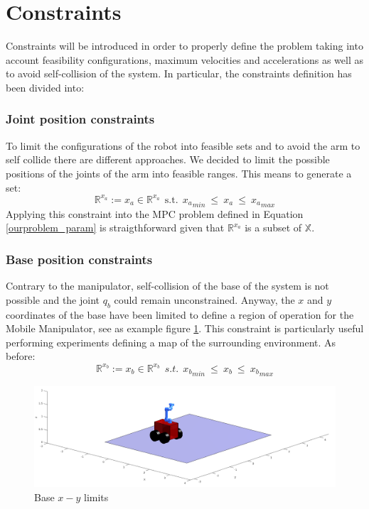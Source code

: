 \section{Constraints}

Constraints will be introduced in order to properly define the problem taking into account feasibility configurations, maximum velocities and accelerations as well as to avoid self-collision of the system. In particular, the constraints definition has been divided into: 

\subsubsection*{Joint position constraints}
	To limit the configurations of the robot into feasible sets and to avoid the arm to self collide there are different approaches. We decided to limit the possible positions of the joints of the arm into feasible ranges. This means to generate a set:
	\begin{equation}
		\mathbb{R}^{x_a}:=x_a \in \mathbb{R}^{x_a}\ \ \text{s.t.}\ \  {x_a}_{min}\ \leq\ x_a\ \leq\ {x_a}_{max} 
	\end{equation}
	Applying this constraint into the MPC problem defined in Equation \ref{ourproblem_param} is straigthforward given that $\mathbb{R}^{x_a}$ is a subset of $\mathbb{X}$.
\subsubsection*{Base position constraints}
	Contrary to the manipulator, self-collision of the base of the system is not possible and the joint $q_b$ could remain unconstrained. Anyway, the $x$ and $y$ coordinates of the base have been limited to define a region of operation for the Mobile Manipulator, see as example figure \ref{xy_limits}. This constraint is particularly useful performing experiments defining a map of the surrounding environment. As before: 
	\begin{equation}
		\mathbb{R}^{x_b}:=x_b \in \mathbb{R}^{x_b}\ \ s.t.\ \  {x_b}_{min}\ \leq\ x_b\ \leq\ {x_b}_{max} 
	\end{equation}

	\begin{figure}[h!]
	\centering
	\includegraphics[scale=0.25]{IMMAGINI/xy_limits.png}
	\caption{Base $x-y$ limits}
	\label{xy_limits}
	\end{figure}

